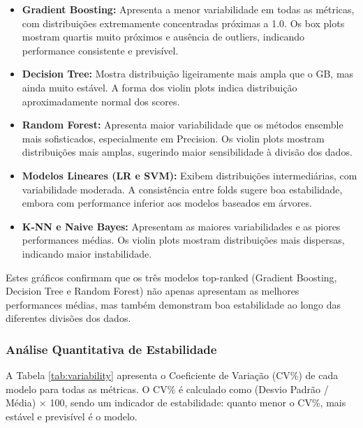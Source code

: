 \documentclass[12pt,a4paper]{article}
\begin{document}
\begin{itemize}
    \item \textbf{Gradient Boosting:} Apresenta a menor variabilidade em todas as métricas, com distribuições extremamente concentradas próximas a 1.0. Os box plots mostram quartis muito próximos e ausência de outliers, indicando performance consistente e previsível.
    
    \item \textbf{Decision Tree:} Mostra distribuição ligeiramente mais ampla que o GB, mas ainda muito estável. A forma dos violin plots indica distribuição aproximadamente normal dos scores.
    
    \item \textbf{Random Forest:} Apresenta maior variabilidade que os métodos ensemble mais sofisticados, especialmente em Precision. Os violin plots mostram distribuições mais amplas, sugerindo maior sensibilidade à divisão dos dados.
    
    \item \textbf{Modelos Lineares (LR e SVM):} Exibem distribuições intermediárias, com variabilidade moderada. A consistência entre folds sugere boa estabilidade, embora com performance inferior aos modelos baseados em árvores.
    
    \item \textbf{K-NN e Naive Bayes:} Apresentam as maiores variabilidades e as piores performances médias. Os violin plots mostram distribuições mais dispersas, indicando maior instabilidade.
\end{itemize}

Estes gráficos confirmam que os três modelos top-ranked (Gradient Boosting, Decision Tree e Random Forest) não apenas apresentam as melhores performances médias, mas também demonstram boa estabilidade ao longo das diferentes divisões dos dados.

\subsubsection{Análise Quantitativa de Estabilidade}

A Tabela \ref{tab:variability} apresenta o Coeficiente de Variação (CV\%) de cada modelo para todas as métricas. O CV\% é calculado como (Desvio Padrão / Média) × 100, sendo um indicador de estabilidade: quanto menor o CV\%, mais estável e previsível é o modelo.
\end{document}
